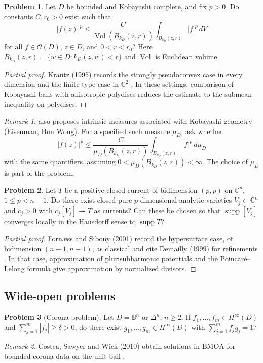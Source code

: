 \documentclass[11pt,reqno]{amsart}
\theoremstyle{definition}
\newtheorem{problem}{Problem}[section]
\theoremstyle{remark}
\newtheorem*{remark}{Remark}
\begin{document}
\begin{problem}\label{b95-13-0-3}
Let $D$ be bounded and Kobayashi complete, and fix $p>0$. Do constants $C,r_0>0$ exist such that
\[
 |f(z)|^p\leq
 \frac{C}{\operatorname{Vol}(B_{k_D}(z,r))}
 \int_{B_{k_D}(z,r)}|f|^p\,dV
\]
for all $f\in\mathcal O(D)$, $z\in D$, and $0<r<r_0$? Here $B_{k_D}(z,r)=\{w\in D:k_D(z,w)<r\}$ and $\operatorname{Vol}$ is Euclidean volume.
\end{problem}
\begin{proof}[Partial proof]
Krantz (1995) records the strongly pseudoconvex case in every dimension and the finite-type case in $\mathbb C^2$ \cite[Problem~13.0.3]{B95}. In these settings, comparison of Kobayashi balls with anisotropic polydiscs reduces the estimate to the submean inequality on polydiscs.
\end{proof}
\begin{remark}
\cite[Problem~13.0.3]{B95} also proposes intrinsic measures associated with Kobayashi geometry (Eisenman, Bun Wong). For a specified such measure $\mu_D$, ask whether
\[
 |f(z)|^p\leq\frac{C}{\mu_D(B_{k_D}(z,r))}
 \int_{B_{k_D}(z,r)}|f|^p\,d\mu_D
\]
with the same quantifiers, assuming $0<\mu_D(B_{k_D}(z,r))<\infty$. The choice of $\mu_D$ is part of the problem.
\end{remark}

\begin{problem}\label{FS-3.6}
Let $T$ be a positive closed current of bidimension $(p,p)$ on $\mathbb C^n$, $1\leq p<n-1$. Do there exist closed pure $p$-dimensional analytic varieties $V_j\subset\mathbb C^n$ and $c_j>0$ with $c_j[V_j]\rightharpoonup T$ as currents? Can these be chosen so that $\operatorname{supp}[V_j]$ converges locally in the Hausdorff sense to $\operatorname{supp}T$?
\end{problem}
\begin{proof}[Partial proof]
Forn\ae ss and Sibony (2001) record the hypersurface case, of bidimension $(n-1,n-1)$, as classical and cite Demailly (1999) for refinements \cite[Question~3.6]{FS2001}\cite{FS-Demailly}. In that case, approximation of plurisubharmonic potentials and the Poincar\'e--Lelong formula give approximation by normalized divisors.
\end{proof}

\subsection{Wide-open problems}

\begin{problem}[Corona problem]\label{b95-5-2-1}
Let $D=\mathbb B^n$ or $\Delta^n$, $n\geq2$. If $f_1,\ldots,f_m\in H^\infty(D)$ and $\sum_{j=1}^m|f_j|\geq\delta>0$, do there exist $g_1,\ldots,g_m\in H^\infty(D)$ with $\sum_{j=1}^m f_jg_j=1$?
\end{problem}
\begin{remark}
Costea, Sawyer and Wick (2010) obtain solutions in $\mathrm{BMOA}$ for bounded corona data on the unit ball \cite{B95-CSW}.
\end{remark}
\end{document}
